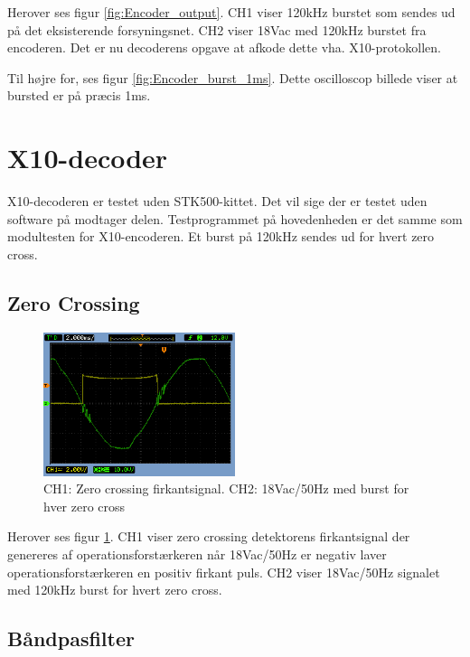 Herover ses figur \ref{fig:Encoder_output}. CH1 viser 120kHz burstet som sendes ud på det eksisterende forsyningsnet. CH2 viser 18Vac med 120kHz burstet fra encoderen. Det er nu decoderens opgave at afkode dette vha. X10-protokollen.

Til højre for, ses figur \ref{fig:Encoder_burst_1ms}. Dette oscilloscop billede viser at bursted er på præcis 1ms. 


\section{X10-decoder}
X10-decoderen er testet uden STK500-kittet. Det vil sige der er testet uden software på modtager delen. Testprogrammet på hovedenheden er det samme som modultesten for X10-encoderen. Et burst på 120kHz sendes ud for hvert zero cross. 

\subsection{Zero Crossing}

\begin{figure}[H]
	\centering
	\includegraphics[width=0.50\textwidth]{billeder/HWTest/Decoder/Decoder_zerocross}
	\caption{CH1: Zero crossing firkantsignal. CH2: 18Vac/50Hz med burst for hver zero cross}
	\label{fig:Decoder_ZC}
\end{figure}

Herover ses figur \ref{fig:Decoder_ZC}. CH1 viser zero crossing detektorens firkantsignal der genereres af operationsforstærkeren når 18Vac/50Hz er negativ laver operationsforstærkeren en positiv firkant puls. CH2 viser 18Vac/50Hz signalet med 120kHz burst for hvert zero cross.   

\subsection{Båndpasfilter}

